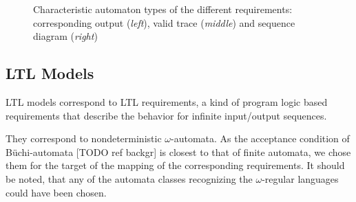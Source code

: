 \begin{figure}[!ht] 
	\centering
	\caption{Characteristic automaton types of the different requirements: corresponding output (\textit{left}), valid trace (\textit{middle}) and sequence diagram (\textit{right})} 
	\label{fig_architcture_traceautomata}
\end{figure}

\subsection{LTL Models} \label{subs_ltlintheframework}

LTL models correspond to LTL requirements, a kind of program logic based requirements that describe the behavior for infinite input/output sequences.%

They correspond to nondeterministic $\omega$-automata. As the acceptance condition of Büchi-automata [TODO ref backgr] is closest to that of finite automata, we chose them for the target of the mapping of the corresponding requirements. It should be noted, that any of the automata classes recognizing the $\omega$-regular languages could have been chosen.

